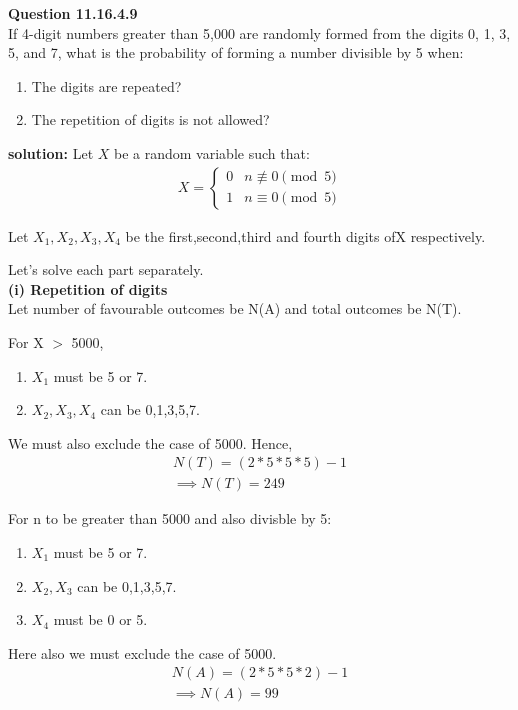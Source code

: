 \documentclass{article}
\begin{document}
\providecommand{\pr}[1]{\ensuremath{\Pr\left(#1\right)}}
\providecommand{\brak}[1]{\ensuremath{\left(#1\right)}}
\newcommand{\solution}{\noindent \textbf{solution: }}

\textbf{Question 11.16.4.9}\\
If 4-digit numbers greater than 5,000 are randomly formed from the digits 0, 1, 3, 5, and 7, what is the probability of forming a number divisible by 5 when:
\begin{enumerate}
    \item The digits are repeated?
    \item The repetition of digits is not allowed?
\end{enumerate}

\solution
Let $X$ be a random variable such that:
\begin{align}
	X = \begin{cases}
		0 & n \not\equiv 0 \pmod{5}\\
		1 & n \equiv 0 \pmod{5}\end{cases}
\end{align}

Let $X_{1},X_{2},X_{3},X_{4}$ be the first,second,third and fourth digits ofX respectively.

Let's solve each part separately. \\

\textbf{(i) Repetition of digits}\\
Let number of favourable outcomes be N(A) and total outcomes be N(T).

For X $>$ 5000,
\begin{enumerate}
	\item $X_{1}$ must be 5 or 7.
	\item $X_{2},X_{3},X_{4}$ can be 0,1,3,5,7.
\end{enumerate}
We must also exclude the case of 5000.
Hence,
\begin{align}
	N(T)=(2*5*5*5)-1 \\
	\implies N(T)=249
\end{align}

For n to be greater than 5000 and also divisble by 5:
\begin{enumerate}
	\item $X_{1}$ must be 5 or 7.
	\item $X_{2},X_{3}$ can be 0,1,3,5,7.
	\item $X_{4}$ must be 0 or 5.
\end{enumerate}
Here also we must exclude the case of 5000.
\begin{align}
	N(A)=(2*5*5*2)-1 \\
	\implies N(A)=99
\end{align}
\end{document}
